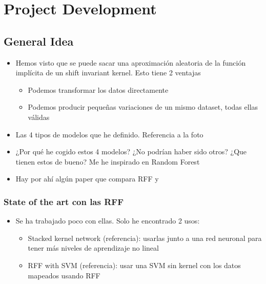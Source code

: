 
\chapter{Project Development} %

\label{Chapter3} %


\section{General Idea}
\begin{note}
  \begin{itemize}
    \item Hemos visto que se puede sacar una aproximación aleatoria de la
    función implícita de un shift invariant kernel. Esto tiene 2 ventajas
    \begin{itemize}
      \item Podemos transformar los datos directamente
      \item Podemos producir pequeñas variaciones de un mismo dataset, todas
      ellas válidas
    \end{itemize}
    \item Las 4 tipos de modelos que he definido. Referencia a la foto
    \item ¿Por qué he cogido estos 4 modelos? ¿No podrían haber sido otros?
    ¿Que tienen estos de bueno? Me he inspirado en Random Forest
    \item Hay por ahí algún paper que compara RFF y \Nys
  \end{itemize}
\end{note}
\begin{note}
  \subsection{State of the art con las RFF}
\end{note}
\begin{note}
  \begin{itemize}
    \item Se ha trabajado poco con ellas. Solo he encontrado 2 usos:
    \begin{itemize}
      \item Stacked kernel network (referencia): usarlas junto a una red
      neuronal para tener más niveles de aprendizaje no lineal
      \item RFF with SVM (referencia): usar una SVM sin kernel con los datos
      mapeados usando RFF
    \end{itemize}
  \end{itemize}
\end{note}
